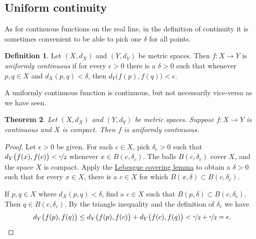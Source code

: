 \documentclass[12pt,openany]{book}
\theoremstyle{plain}
\newtheorem{thm}{Theorem}[section]
\theoremstyle{remark}
\theoremstyle{definition}
\newtheorem{defn}[thm]{Definition}
\theoremstyle{exercise}
\theoremstyle{example}
\begin{document}
\subsection{Uniform continuity}

As for continuous
functions on the real line, in the definition of continuity
it is sometimes convenient to be able to pick
one $\delta$ for all points.

\begin{defn}
Let $(X,d_X)$ and $(Y,d_Y)$ be metric spaces.
Then $f \colon X \to Y$ is
\emph{uniformly continuous}
if for every $\epsilon > 0$
there is a $\delta > 0$ such that whenever $p,q \in X$ and $d_X(p,q) <
\delta$, then
$d_Y\bigl(f(p),f(q)\bigr) < \epsilon$.
\end{defn}

A uniformly continuous function is continuous, but not necessarily
vice-versa as we have seen.

\begin{thm} \label{thm:Xcompactfunifcont}
Let $(X,d_X)$ and $(Y,d_Y)$ be metric spaces.
Suppose $f \colon X \to Y$ is continuous and $X$ is compact.  Then
$f$ is uniformly continuous.
\end{thm}

\begin{proof}
Let $\epsilon > 0$ be given.  For each $c \in X$, pick $\delta_c > 0$ such that
$d_Y\bigl(f(x),f(c)\bigr) < \nicefrac{\epsilon}{2}$
whenever
$x \in B(c,\delta_c)$.
The balls
$B(c,\delta_c)$ cover $X$, and the space $X$ is compact.  
Apply the \hyperref[ms:lebesgue]{Lebesgue covering lemma} to obtain a 
$\delta > 0$ such that for every $x \in X$, there is a $c \in X$
for which $B(x,\delta) \subset B(c,\delta_c)$.

If $p, q \in X$ where $d_X(p,q) < \delta$,
find a $c \in X$ such that $B(p,\delta) \subset B(c,\delta_c)$.
Then $q \in B(c,\delta_c)$.  By the triangle inequality
and the definition of $\delta_c$ we have
\begin{equation*}
d_Y\bigl(f(p),f(q)\bigr)
\leq
d_Y\bigl(f(p),f(c)\bigr)
+
d_Y\bigl(f(c),f(q)\bigr)
<
\nicefrac{\epsilon}{2}+
\nicefrac{\epsilon}{2} = \epsilon .  \qedhere
\end{equation*}
\end{proof}
\end{document}
